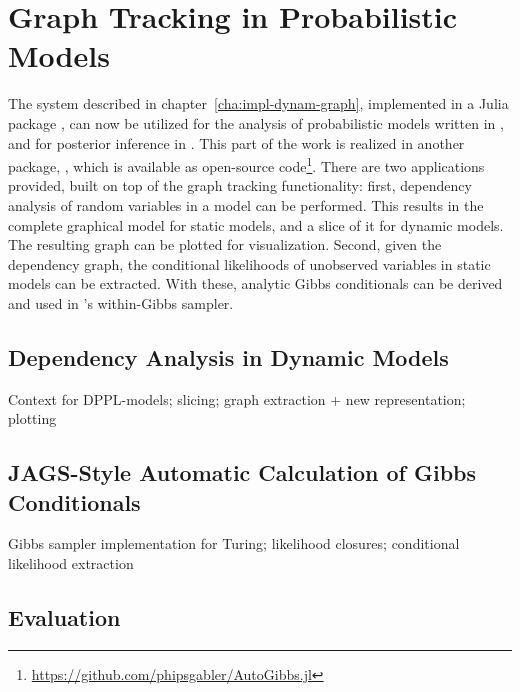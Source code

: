 \chapter{Graph Tracking in Probabilistic Models}
\label{cha:graph-track-prob}

The system described in chapter~\ref{cha:impl-dynam-graph}, implemented in a Julia package
\irtrackerjl{}, can now be utilized for the analysis of probabilistic models written in \dppljl{},
and for posterior inference in \turingjl{}.  This part of the work is realized in another package,
\autogibbsjl{}, which is available as open-source
code\footnote{\url{https://github.com/phipsgabler/AutoGibbs.jl}}.  There are two applications
provided, built on top of the graph tracking functionality: first, dependency analysis of random
variables in a model can be performed.  This results in the complete graphical model for static
models, and a slice of it for dynamic models.  The resulting graph can be plotted for visualization.
Second, given the dependency graph, the conditional likelihoods of unobserved variables in static
models can be extracted.  With these, analytic Gibbs conditionals can be derived and used in
\turingjl{}'s within-Gibbs sampler.

\section{Dependency Analysis in Dynamic Models}
\label{sec:depend-analysis}



Context for DPPL-models; slicing; graph extraction + new representation; plotting

\section{JAGS-Style Automatic Calculation of Gibbs Conditionals}
\label{sec:jags-style-conditionals}

Gibbs sampler implementation for Turing; likelihood closures; conditional likelihood extraction


\section{Evaluation}
\label{sec:autogibbs-eval}

